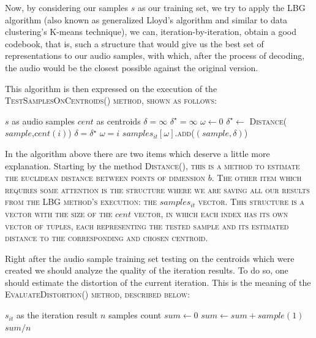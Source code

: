 \documentclass[conference]{IEEEtran}
\begin{document}
Now, by considering our samples $s$ as our training set, we try to apply the \ac{LBG} algorithm (also known as generalized Lloyd's algorithm and similar to data clustering's K-means technique), we can, iteration-by-iteration, obtain a good codebook, that is, such a structure that would give us the best set of representations to our audio samples, with which, after the process of decoding, the audio would be the closest possible against the original version.

This algorithm is then expressed on the execution of the \scshape TestSamplesOnCentroids() \upshape method, shown as follows:

\begin{algorithmic}[1]
	\REQUIRE $s$ as audio samples \AND $cent$ as centroids 
		\STATE $\delta = \infty$ 
		\STATE $\delta^\star = \infty$ 
		\STATE $\omega \leftarrow 0$ 
			\STATE $\delta^\star \leftarrow$ \scshape{Distance($sample$,$cent(i)$)} \upshape
			\IF{$\delta^\star < \delta$} 
				\STATE $\delta = \delta^\star$
				\STATE $\omega = i$
			\ENDIF
		\ENDFOR
		\STATE $samples_{it}\left[\omega\right].$\scshape{add($(sample,\delta)$)}\upshape
	\ENDFOR
\end{algorithmic}

In the algorithm above there are two items which deserve a little more explanation. Starting by the method \scshape{Distance()}\upshape, this is a method to estimate the euclidean distance between points of dimension $b$. The other item which requires some attention is the structure where we are saving all our results from the LBG method's execution: the $samples_{it}$ vector. This structure is a vector with the size of the $cent$ vector, in which each index has its own vector of tuples, each representing the tested sample and its estimated distance to the corresponding and chosen centroid.

Right after the audio sample training set testing on the centroids which were created we should analyze the quality of the iteration results. To do so, one should estimate the distortion of the current iteration. This is the meaning of the \scshape{EvaluateDistortion()} \upshape method, described below:

\begin{algorithmic}[1]
	\REQUIRE $s_{it}$ as the iteration result \AND $n$ samples count
	\STATE $sum \leftarrow 0$
			\STATE $sum \leftarrow sum + sample(1)$
		\ENDFOR
	\ENDFOR
	\RETURN $sum/n$
\end{algorithmic}
\end{document}

